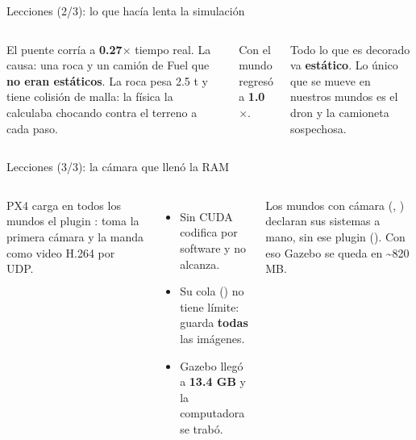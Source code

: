 \begin{frame}{Lecciones (2/3): lo que hacía lenta la simulación}
  \begin{columns}[c]
    \small
    El puente corría a \textbf{0.27$\times$} tiempo real. La causa: una roca y un camión de Fuel que
    \textbf{no eran estáticos}. La roca pesa 2.5 t y tiene colisión de malla: la física la
    calculaba chocando contra el terreno a cada paso.
    \vspace{0.3em}

    Con  el mundo regresó a \textbf{1.0$\times$}.
    \begin{idea}
      \small Todo lo que es decorado va \textbf{estático}. Lo único que se mueve en nuestros
      mundos es el dron y la camioneta sospechosa.
    \end{idea}
  \end{columns}
\end{frame}

\begin{frame}{Lecciones (3/3): la cámara que llenó la RAM}
  \begin{columns}[c]
    \small
    PX4 carga en todos los mundos el plugin : toma la primera cámara y la manda
    como video H.264 por UDP.
    \begin{itemize}
      \item Sin CUDA codifica por software y no alcanza.
      \item Su cola () no tiene límite: guarda \textbf{todas} las imágenes.
      \item Gazebo llegó a \textbf{13.4 GB} y la computadora se trabó.
    \end{itemize}
    \begin{idea}
      \small Los mundos con cámara (, ) declaran sus sistemas
      a mano, sin ese plugin (). Con eso Gazebo se queda en
      \textasciitilde820 MB.
    \end{idea}
  \end{columns}
\end{frame}

